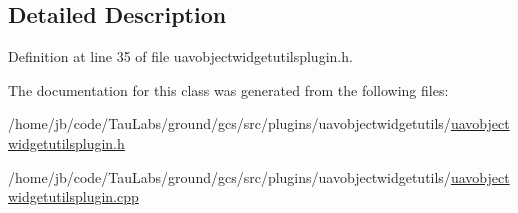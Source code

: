 \subsection{\-Detailed \-Description}


\-Definition at line 35 of file uavobjectwidgetutilsplugin.\-h.



\-The documentation for this class was generated from the following files\-:\begin{DoxyCompactItemize}
\item 
/home/jb/code/\-Tau\-Labs/ground/gcs/src/plugins/uavobjectwidgetutils/\hyperlink{uavobjectwidgetutilsplugin_8h}{uavobjectwidgetutilsplugin.\-h}\item 
/home/jb/code/\-Tau\-Labs/ground/gcs/src/plugins/uavobjectwidgetutils/\hyperlink{uavobjectwidgetutilsplugin_8cpp}{uavobjectwidgetutilsplugin.\-cpp}\end{DoxyCompactItemize}
